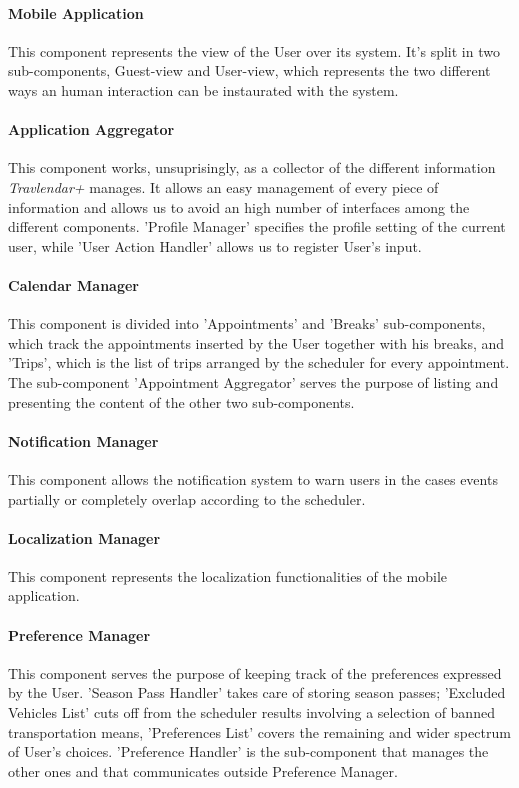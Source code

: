 \paragraph{Mobile Application}
	This component represents the view of the User over its system. It’s split in two sub-components, Guest-view and User-view, which represents the two different ways an human interaction can be instaurated with the system.

\paragraph{Application Aggregator}
	This component works, unsuprisingly, as a collector of the different information \textit{Travlendar+} manages. It allows an easy management of every piece of information and allows us to avoid an high number of interfaces among the different components. 'Profile Manager' specifies the profile setting of the current user, while 'User Action Handler' allows us to register User's input.
 
\paragraph{Calendar Manager}
	This component is divided into 'Appointments' and 'Breaks' sub-components, which track the appointments inserted by the User together with his breaks, and 'Trips', which is the list of trips arranged by the scheduler for every appointment. The sub-component 'Appointment Aggregator' serves the purpose of listing and presenting the content of the other two sub-components.

\paragraph{Notification Manager}
	This component allows the notification system to warn users in the cases events partially or completely overlap according to the scheduler.

\paragraph{Localization Manager}
	This component represents the localization functionalities of the mobile application.  

\paragraph{Preference Manager}
	This component serves the purpose of keeping track of the preferences expressed by the User. 'Season Pass Handler' takes care of storing season passes; 'Excluded Vehicles List' cuts off from the scheduler results involving a selection of banned transportation means, 'Preferences List' covers the remaining and wider spectrum of User's choices. 'Preference Handler' is the sub-component that manages the other ones and that communicates outside Preference Manager.

